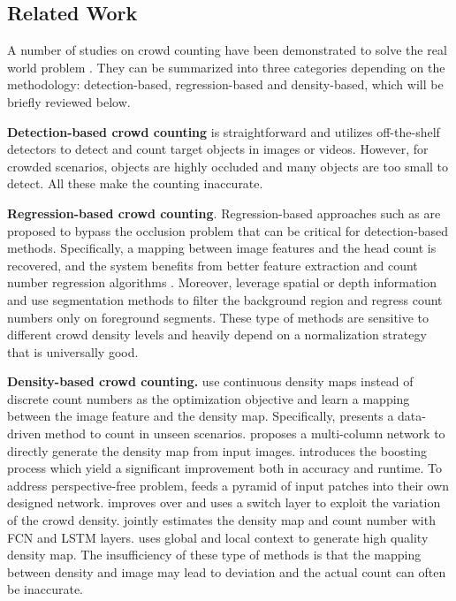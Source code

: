 \documentclass[journal]{IEEEtran}
\begin{document}
\subsection{Related Work}
\label{sec:rw}
A number of studies on crowd counting have been demonstrated to solve the real world problem \cite{loy2013crowd,sindagi2017survey}. They can be summarized into three categories depending on the methodology: detection-based, regression-based and density-based, which will be briefly reviewed below.

\vspace{0.05in}\noindent \textbf{Detection-based crowd counting} is straightforward and utilizes off-the-shelf detectors \cite{li2008estimating,leibe2005pedestrian,wang2009crowd} to detect and count target objects in images or videos. However, for crowded scenarios, objects are highly occluded and many objects are too small to detect. All these make the counting inaccurate.


\vspace{0.05in}\noindent \textbf{Regression-based crowd counting}. Regression-based approaches such as \cite{chan2009bayesian,chen2012feature,Segui:2015ho,CarlosArteta:2014vm,Shang:2016iq, kumagai2017mixture,wang2017deep} are proposed to bypass the occlusion problem that can be critical for detection-based methods. Specifically, a mapping between image features and the head count is recovered, and the system benefits from better feature extraction and count number regression algorithms \cite{chen2012feature, Segui:2015ho,Shang:2016iq,chan2009bayesian, CarlosArteta:2014vm}. Moreover, \cite{chan2008privacy, ryan2009crowd,chan2012counting,fu2012real} leverage spatial or depth information and use segmentation methods to filter the background region and regress count numbers only on foreground segments. These type of methods are sensitive to different crowd density levels and heavily depend on a normalization strategy that is universally good.

\vspace{0.05in}\noindent \textbf{Density-based crowd counting.} \cite{lempitsky2010learning,Zhang:2015id,Zhang:2016fr,sam2017switching,Sindagi:2017vv,zhang2017fcn} use continuous density maps instead of discrete count numbers as the optimization objective and learn a mapping between the image feature and the density map. Specifically, \cite{Zhang:2015id} presents a data-driven method to count in unseen scenarios. \cite{Zhang:2016fr} proposes a multi-column network to directly generate the density map from input images. \cite{walach2016learning} introduces the boosting process which yield a significant improvement both in accuracy and runtime. To address perspective-free problem, \cite{onoro2016towards} feeds a pyramid of input patches into their own designed network. \cite{sam2017switching} improves over \cite{Zhang:2016fr} and uses a switch layer to exploit the variation of the crowd density. \cite{zhang2017fcn} jointly estimates the density map and count number with FCN and LSTM layers. \cite{Sindagi:2017vv} uses global and local context to generate high quality density map. The insufficiency of these type of methods is that the mapping between density and image may lead to deviation and the actual count can often be inaccurate.
\end{document}

